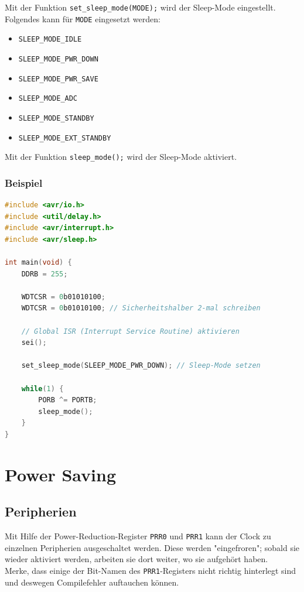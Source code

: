 Mit der Funktion \verb|set_sleep_mode(MODE);| wird der Sleep-Mode eingestellt. Folgendes kann für \verb|MODE| eingesetzt werden:
\begin{itemize}
    \item \verb|SLEEP_MODE_IDLE|
    \item \verb|SLEEP_MODE_PWR_DOWN|
    \item \verb|SLEEP_MODE_PWR_SAVE|
    \item \verb|SLEEP_MODE_ADC|
    \item \verb|SLEEP_MODE_STANDBY|
    \item \verb|SLEEP_MODE_EXT_STANDBY|
\end{itemize}

Mit der Funktion \verb|sleep_mode();| wird der Sleep-Mode aktiviert. \\

\subsubsection*{Beispiel}
\begin{lstlisting}[language=C]
#include <avr/io.h>
#include <util/delay.h>
#include <avr/interrupt.h>
#include <avr/sleep.h>

int main(void) {
    DDRB = 255;

    WDTCSR = 0b01010100;
    WDTCSR = 0b01010100; // Sicherheitshalber 2-mal schreiben

    // Global ISR (Interrupt Service Routine) aktivieren
    sei(); 

    set_sleep_mode(SLEEP_MODE_PWR_DOWN); // Sleep-Mode setzen

    while(1) {
	    PORB ^= PORTB;
        sleep_mode();
    }
}
\end{lstlisting}

\section{Power Saving}
\subsection{Peripherien}
Mit Hilfe der Power-Reduction-Register \verb|PRR0| und \verb|PRR1| kann der Clock zu einzelnen Peripherien ausgeschaltet werden. Diese werden "eingefroren"; sobald sie wieder aktiviert werden, arbeiten sie dort weiter, wo sie aufgehört haben.\\
Merke, dass einige der Bit-Namen des \verb|PRR1|-Registers nicht richtig hinterlegt sind und deswegen Compilefehler auftauchen können.
